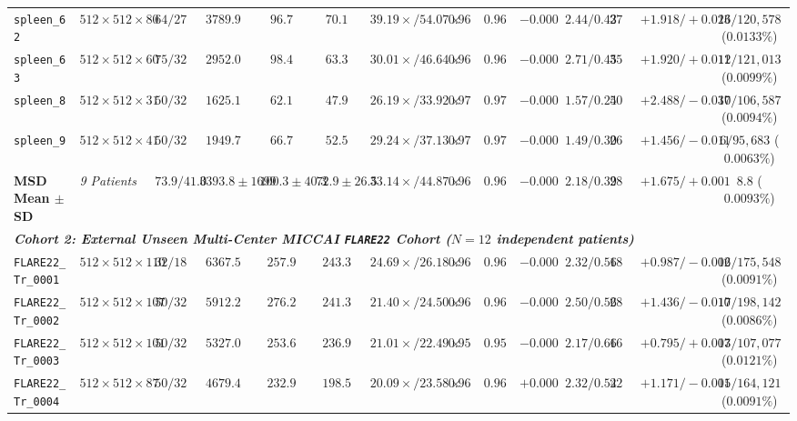 \documentclass[10pt,twocolumn]{article}
\begin{document}
\begin{table}[t]
{\begin{tabular}{llcccccccccccc}
\texttt{spleen\_62} & $512 \times 512 \times 80$ & $64 / 27$ & $3789.9$ & $96.7$ & $70.1$ & $39.19\times / 54.07\times$ & $0.961134$ & $0.961119$ & $-0.000015$ & $2.44 / 0.43$ & $275.93$ & $+1.918 / +0.023$ & $16 / 120,578$ ($0.0133\%$) \\
\texttt{spleen\_63} & $512 \times 512 \times 60$ & $75 / 32$ & $2952.0$ & $98.4$ & $63.3$ & $30.01\times / 46.64\times$ & $0.963625$ & $0.963618$ & $-0.000007$ & $2.71 / 0.45$ & $356.60$ & $+1.920 / +0.011$ & $12 / 121,013$ ($0.0099\%$) \\
\texttt{spleen\_8} & $512 \times 512 \times 31$ & $50 / 32$ & $1625.1$ & $62.1$ & $47.9$ & $26.19\times / 33.92\times$ & $0.973413$ & $0.973384$ & $-0.000029$ & $1.57 / 0.24$ & $501.55$ & $+2.488 / -0.037$ & $10 / 106,587$ ($0.0094\%$) \\
\texttt{spleen\_9} & $512 \times 512 \times 41$ & $50 / 32$ & $1949.7$ & $66.7$ & $52.5$ & $29.24\times / 37.13\times$ & $0.970787$ & $0.970786$ & $-0.000001$ & $1.49 / 0.30$ & $269.15$ & $+1.456 / -0.011$ & $6 / 95,683$ ($0.0063\%$) \\
\textbf{MSD Mean $\pm$ SD} & \textit{9 Patients} & $73.9 / 41.0$ & $3393.8 \pm 1699$ & $100.3 \pm 40.3$ & $72.9 \pm 26.5$ & $\mathbf{33.14\times} / \mathbf{44.87\times}$ & $0.965233$ & $\mathbf{0.965229}$ & $-0.000004$ & $\mathbf{2.18 / 0.39}$ & $286.73$ & $\mathbf{+1.675 / +0.001}$ & $\mathbf{8.8}$ ($\mathbf{0.0093\%}$) \\
\midrule
\multicolumn{14}{l}{\textit{\textbf{Cohort 2: External Unseen Multi-Center MICCAI \texttt{FLARE22} Cohort ($N = 12$ independent patients)}}}\\
\texttt{FLARE22\_Tr\_0001} & $512 \times 512 \times 110$ & $32 / 18$ & $6367.5$ & $257.9$ & $243.3$ & $24.69\times / 26.18\times$ & $0.961213$ & $0.961207$ & $-0.000006$ & $2.32 / 0.56$ & $186.17$ & $+0.987 / -0.002$ & $16 / 175,548$ ($0.0091\%$) \\
\texttt{FLARE22\_Tr\_0002} & $512 \times 512 \times 107$ & $50 / 32$ & $5912.2$ & $276.2$ & $241.3$ & $21.40\times / 24.50\times$ & $0.964399$ & $0.964395$ & $-0.000004$ & $2.50 / 0.56$ & $281.25$ & $+1.436 / -0.010$ & $17 / 198,142$ ($0.0086\%$) \\
\texttt{FLARE22\_Tr\_0003} & $512 \times 512 \times 101$ & $50 / 32$ & $5327.0$ & $253.6$ & $236.9$ & $21.01\times / 22.49\times$ & $0.955464$ & $0.955433$ & $-0.000031$ & $2.17 / 0.66$ & $163.03$ & $+0.795 / +0.007$ & $13 / 107,077$ ($0.0121\%$) \\
\texttt{FLARE22\_Tr\_0004} & $512 \times 512 \times 87$ & $50 / 32$ & $4679.4$ & $232.9$ & $198.5$ & $20.09\times / 23.58\times$ & $0.960944$ & $0.960946$ & $+0.000002$ & $2.32 / 0.54$ & $222.10$ & $+1.171 / -0.001$ & $15 / 164,121$ ($0.0091\%$) \\

\end{tabular}}
\end{table}
\end{document}
